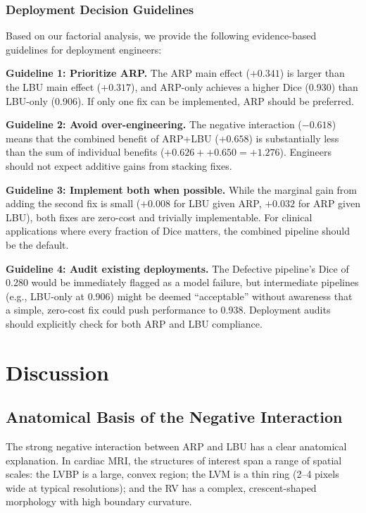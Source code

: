 \documentclass[10pt,twocolumn]{article}
\begin{document}
\subsubsection{Deployment Decision Guidelines}

Based on our factorial analysis, we provide the following evidence-based guidelines for deployment engineers:

\textbf{Guideline 1: Prioritize ARP.}
The ARP main effect ($+0.341$) is larger than the LBU main effect ($+0.317$), and ARP-only achieves a higher Dice (0.930) than LBU-only (0.906).
If only one fix can be implemented, ARP should be preferred.

\textbf{Guideline 2: Avoid over-engineering.}
The negative interaction ($-0.618$) means that the combined benefit of ARP+LBU ($+0.658$) is substantially less than the sum of individual benefits ($+0.626 + +0.650 = +1.276$).
Engineers should not expect additive gains from stacking fixes.

\textbf{Guideline 3: Implement both when possible.}
While the marginal gain from adding the second fix is small ($+0.008$ for LBU given ARP, $+0.032$ for ARP given LBU), both fixes are zero-cost and trivially implementable.
For clinical applications where every fraction of Dice matters, the combined pipeline should be the default.

\textbf{Guideline 4: Audit existing deployments.}
The Defective pipeline's Dice of 0.280 would be immediately flagged as a model failure, but intermediate pipelines (e.g., LBU-only at 0.906) might be deemed ``acceptable'' without awareness that a simple, zero-cost fix could push performance to 0.938.
Deployment audits should explicitly check for both ARP and LBU compliance.

\section{Discussion}
\label{sec:discussion}

\subsection{Anatomical Basis of the Negative Interaction}

The strong negative interaction between ARP and LBU has a clear anatomical explanation.
In cardiac MRI, the structures of interest span a range of spatial scales: the LVBP is a large, convex region; the LVM is a thin ring (2--4 pixels wide at typical resolutions); and the RV has a complex, crescent-shaped morphology with high boundary curvature.
\end{document}
